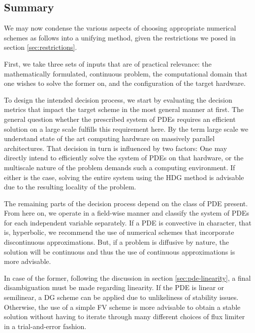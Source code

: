 \documentclass[sn-mathphys,Numbered]{sn-jnl}%
\theoremstyle{thmstyleone}%
\theoremstyle{thmstyletwo}%
\theoremstyle{thmstylethree}%
\begin{document}
\subsection{Summary}

We may now condense the various aspects of choosing appropriate numerical schemes as follows into a unifying method, given the restrictions we posed in section \ref{sec:restrictions}.

First, we take three sets of inputs that are of practical relevance: the mathematically formulated, continuous problem, the computational domain that one wishes to solve the former on, and the configuration of the target hardware.

To design the intended decision process, we start by evaluating the decision metrics that impact the target scheme in the most general manner at first.
The general question whether the prescribed system of PDEs requires an efficient solution on a large scale fulfills this requirement here.
By the term large scale we understand state of the art computing hardware on massively parallel architectures.
That decision in turn is influenced by two factors: One may directly intend to efficiently solve the system of PDEs on that hardware, or the multiscale nature of the problem demands such a computing environment.
If either is the case, solving the entire system using the HDG method is advisable due to the resulting locality of the problem.

The remaining parts of the decision process depend on the class of PDE present.
From here on, we operate in a field-wise manner and classify the system of PDEs for each independent variable separately.
If a PDE is convective in character, that is, hyperbolic, we recommend the use of numerical schemes that incorporate discontinuous approximations.
But, if a problem is diffusive by nature, the solution will be continuous and thus the use of continuous approximations is more advisable.

In case of the former, following the discussion in section \ref{sec:pde-linearity}, a final disambiguation must be made regarding linearity.
If the PDE is linear or semilinear, a DG scheme can be applied due to unlikeliness of stability issues.
Otherwise, the use of a simple FV scheme is more advisable to obtain a stable solution without having to iterate through many different choices of flux limiter in a trial-and-error fashion.
\end{document}
